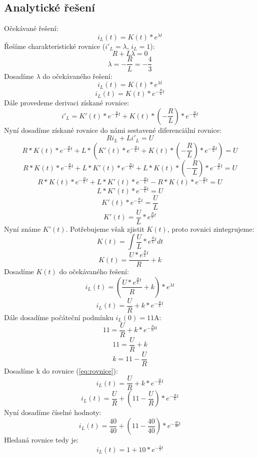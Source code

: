 \documentclass[a4paper]{article}
\begin{document}
\newpage
\subsection{Analytické řešení}
Očekávané řešení:
\[i_L(t) = K(t) * e^{\lambda t}\]
\newline 
Řešíme charakteristické rovnice ($i'_L = \lambda$, $i_L = 1$):
\[R + L\lambda = 0\]
\[\lambda = -\frac{R}{L} = -\frac{4}{3}\]
\newline
Dosadíme $\lambda$ do očekávaného řešení:
\[i_L(t) = K(t) * e^{\lambda t}\]
\[i_L(t) = K(t) * e^{-\frac{R}{L}t}\]
\newline
Dále provedeme derivaci získané rovnice:
\[i'_L = K'(t) * e^{-\frac{R}{L}t} + K(t) * \left( -\frac{R}{L} \right) *  e^{-\frac{R}{L}t}\]
\newline
Nyní dosadíme získané rovnice do námi sestavené diferenciální rovnice:
\[Ri_L +  Li'_L = U\]
\[R *  K(t) * e^{-\frac{R}{L}t} +  L * \left(  K'(t) * e^{-\frac{R}{L}t} + K(t) * \left( -\frac{R}{L} \right) *  e^{-\frac{R}{L}t} \right) = U\]
\[R *  K(t) * e^{-\frac{R}{L}t} +  L * K'(t) * e^{-\frac{R}{L}t} + L * K(t) * \left( -\frac{R}{L} \right) *  e^{-\frac{R}{L}t} = U\]
\[R *  K(t) * e^{-\frac{R}{L}t} +  L * K'(t) * e^{-\frac{R}{L}t} - R * K(t) * e^{-\frac{R}{L}t} = U\]
\[L * K'(t) * e^{-\frac{R}{L}t} = U\]
\[K'(t) * e^{-\frac{R}{L}t} = \frac{U}{L}\]
\[K'(t) = \frac{U}{L} * e^{\frac{R}{L}t}\]
\newline
Nyní známe $K'(t)$. Potřebujeme však zjistit $K(t)$, proto rovnici zintegrujeme:
\[K(t) =\int \frac{U}{L} * e^{\frac{R}{L}t} dt\]
\[K(t) = \frac{U * e^{\frac{R}{L}t}}{R} + k\]
\newline
Dosadíme $K(t)$ do očekávaného řešení:
\[i_L(t) = \left( \frac{U * e^{\frac{R}{L}t}}{R} + k \right) * e^{\lambda t}\]
\begin{equation}
    \label{eq:rovnice}
    i_L(t) = \frac{U}{R} + k * e^{-\frac{R}{L}t}
\end{equation}
\newpage
\noindent
Dále dosadíme počáteční podmínku $i_L(0) = 11\si{\ampere}$:
\[11 = \frac{U}{R} + k * e^{-\frac{R}{L}0}\]
\[11 = \frac{U}{R} + k\]
\[k = 11 - \frac{U}{R}\]
Dosadíme k do rovnice (\ref{eq:rovnice}):
\[i_L(t) = \frac{U}{R} + k * e^{-\frac{R}{L}t}\]
\[i_L(t) = \frac{U}{R} + \left(11 - \frac{U}{R}\right) * e^{-\frac{R}{L}t}\]
\newline
Nyní dosadíme číselné hodnoty:
\[i_L(t) = \frac{40}{40} + \left(11 - \frac{40}{40}\right) * e^{-\frac{40}{30}t}\]
\newline
Hledaná rovnice tedy je:
\[i_L(t) = 1 + 10 * e^{-\frac{4}{3}t}\]
\end{document}
